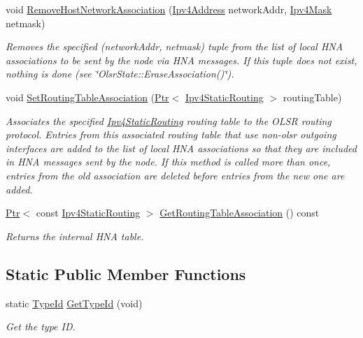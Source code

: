 \begin{DoxyCompactItemize}
void \hyperlink{classns3_1_1olsr_1_1RoutingProtocol_a06c4bb2917ebc46ab608d4c9c3c4cbaa}{Remove\+Host\+Network\+Association} (\hyperlink{classns3_1_1Ipv4Address}{Ipv4\+Address} network\+Addr, \hyperlink{classns3_1_1Ipv4Mask}{Ipv4\+Mask} netmask)
\begin{DoxyCompactList}\small\item\em Removes the specified (network\+Addr, netmask) tuple from the list of local H\+NA associations to be sent by the node via H\+NA messages. If this tuple does not exist, nothing is done (see \char`\"{}\+Olsr\+State\+::\+Erase\+Association()\char`\"{}). \end{DoxyCompactList}\item 
void \hyperlink{classns3_1_1olsr_1_1RoutingProtocol_a54e6ae3299f2f4e6390792801fe01ae3}{Set\+Routing\+Table\+Association} (\hyperlink{classns3_1_1Ptr}{Ptr}$<$ \hyperlink{classns3_1_1Ipv4StaticRouting}{Ipv4\+Static\+Routing} $>$ routing\+Table)
\begin{DoxyCompactList}\small\item\em Associates the specified \hyperlink{classns3_1_1Ipv4StaticRouting}{Ipv4\+Static\+Routing} routing table to the O\+L\+SR routing protocol. Entries from this associated routing table that use non-\/olsr outgoing interfaces are added to the list of local H\+NA associations so that they are included in H\+NA messages sent by the node. If this method is called more than once, entries from the old association are deleted before entries from the new one are added. \end{DoxyCompactList}\item 
\hyperlink{classns3_1_1Ptr}{Ptr}$<$ const \hyperlink{classns3_1_1Ipv4StaticRouting}{Ipv4\+Static\+Routing} $>$ \hyperlink{classns3_1_1olsr_1_1RoutingProtocol_a3fe8efac9decd461ef713cf4451121dd}{Get\+Routing\+Table\+Association} () const 
\begin{DoxyCompactList}\small\item\em Returns the internal H\+NA table. \end{DoxyCompactList}\end{DoxyCompactItemize}
\subsection*{Static Public Member Functions}
\begin{DoxyCompactItemize}
\item 
static \hyperlink{classns3_1_1TypeId}{Type\+Id} \hyperlink{classns3_1_1olsr_1_1RoutingProtocol_a8c75d345a2a52bc56919f469d3e09849}{Get\+Type\+Id} (void)
\begin{DoxyCompactList}\small\item\em Get the type ID. \end{DoxyCompactList}\end{DoxyCompactItemize}
